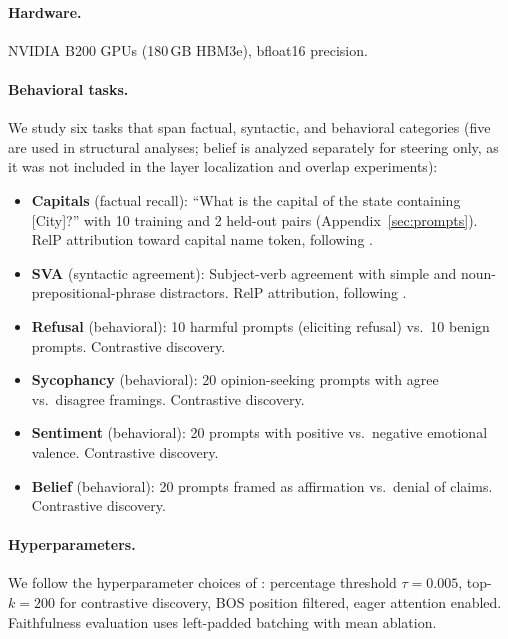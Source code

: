 \documentclass[11pt]{article}
\begin{document}
\paragraph{Hardware.}
NVIDIA B200 GPUs (180\,GB HBM3e), bfloat16 precision.

\paragraph{Behavioral tasks.}
We study six tasks that span factual, syntactic, and behavioral categories (five are used in structural analyses; belief is analyzed separately for steering only, as it was not included in the layer localization and overlap experiments):

\begin{itemize}[leftmargin=2em]
    \item \textbf{Capitals} (factual recall): ``What is the capital of the state containing [City]?'' with 10 training and 2 held-out pairs (Appendix~\ref{sec:prompts}). RelP attribution toward capital name token, following \citet{arora2025circuits}.
    \item \textbf{SVA} (syntactic agreement): Subject-verb agreement with simple and noun-prepositional-phrase distractors. RelP attribution, following \citet{arora2025circuits}.
    \item \textbf{Refusal} (behavioral): 10 harmful prompts (eliciting refusal) vs.\ 10 benign prompts. Contrastive discovery.
    \item \textbf{Sycophancy} (behavioral): 20 opinion-seeking prompts with agree vs.\ disagree framings. Contrastive discovery.
    \item \textbf{Sentiment} (behavioral): 20 prompts with positive vs.\ negative emotional valence. Contrastive discovery.
    \item \textbf{Belief} (behavioral): 20 prompts framed as affirmation vs.\ denial of claims. Contrastive discovery.
\end{itemize}

\paragraph{Hyperparameters.}
We follow the hyperparameter choices of \citet{arora2025circuits}: percentage threshold $\tau{=}0.005$, top-$k = 200$ for contrastive discovery, BOS position filtered, eager attention enabled.
Faithfulness evaluation uses left-padded batching with mean ablation.


\end{document}
